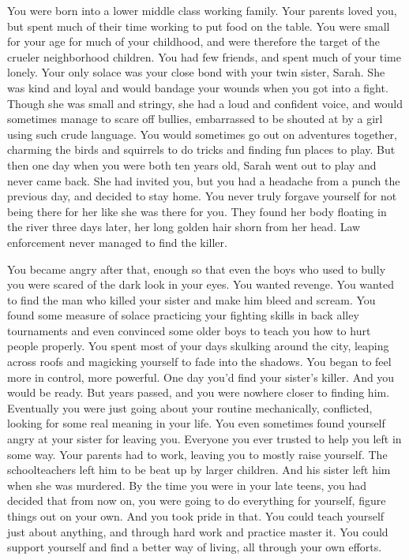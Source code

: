 \documentclass[char]{guildcamp3}
\begin{document}
\name{\cRogueOne{}}

You were born into a lower middle class working family. Your parents loved you, but spent much of their time working to put food on the table. You were small for your age for much of your childhood, and were therefore the target of the crueler neighborhood children. You had few friends, and spent much of your time lonely. Your only solace was your close bond with your twin sister, Sarah. She was kind and loyal and would bandage your wounds when you got into a fight. Though she was small and stringy, she had a loud and confident voice, and would sometimes manage to scare off bullies, embarrassed to be shouted at by a girl using such crude language. You would sometimes go out on adventures together, charming the birds and squirrels to do tricks and finding fun places to play. But then one day when you were both ten years old, Sarah went out to play and never came back. She had invited you, but you had a headache from a punch the previous day, and decided to stay home. You never truly forgave yourself for not being there for her like she was there for you. They found her body floating in the river three days later, her long golden hair shorn from her head. Law enforcement never managed to find the killer.

You became angry after that, enough so that even the boys who used to bully you were scared of the dark look in your eyes. You wanted revenge. You wanted to find the man who killed your sister and make him bleed and scream. You found some measure of solace practicing your fighting skills in back alley tournaments and even convinced some older boys to teach you how to hurt people properly. You spent most of your days skulking around the city, leaping across roofs and magicking yourself to fade into the shadows. You began to feel more in control, more powerful. One day you'd find your sister's killer. And you would be ready. But years passed, and you were nowhere closer to finding him. Eventually you were just going about your routine mechanically, conflicted, looking for some real meaning in your life. You even sometimes found yourself angry at your sister for leaving you. Everyone you ever trusted to help you left in some way. Your parents had to work, leaving you to mostly raise yourself. The schoolteachers left him to be beat up by larger children. And his sister left him when she was murdered. By the time you were in your late teens, you had decided that from now on, you were going to do everything for yourself, figure things out on your own. And you took pride in that. You could teach yourself just about anything, and through hard work and practice master it. You could support yourself and find a better way of living, all through your own efforts.
\end{document}
